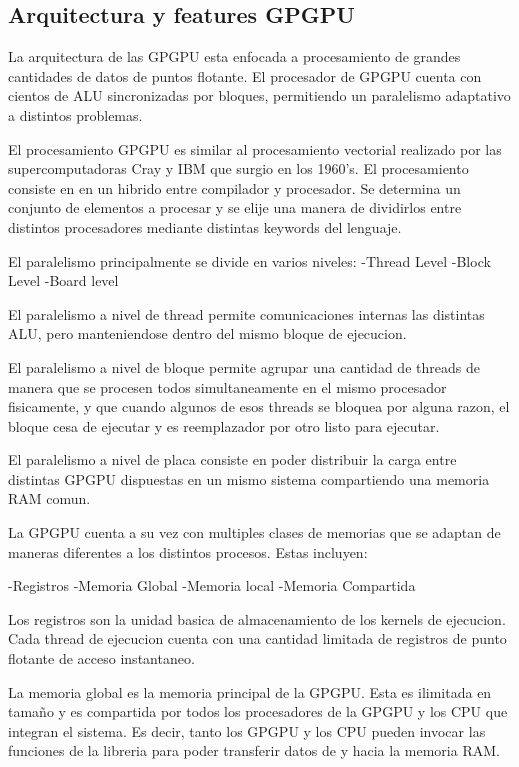 \subsection{Arquitectura y features GPGPU}


La arquitectura de las GPGPU esta enfocada a procesamiento de grandes cantidades de datos
de puntos flotante. El procesador de GPGPU cuenta con cientos de ALU sincronizadas
por bloques, permitiendo un paralelismo adaptativo a distintos problemas.

El procesamiento GPGPU es similar al procesamiento vectorial 
realizado por las supercomputadoras Cray y IBM que surgio en los 1960's.
El procesamiento consiste en en un hibrido entre compilador y procesador. Se determina
un conjunto de elementos a procesar y se elije una manera de dividirlos entre distintos
procesadores mediante distintas keywords del lenguaje. 

El paralelismo principalmente se divide en varios niveles:
-Thread Level
-Block Level
-Board level

El paralelismo a nivel de thread permite comunicaciones internas las distintas ALU, pero
manteniendose dentro del mismo bloque de ejecucion.

El paralelismo a nivel de bloque permite agrupar una cantidad de threads de manera
que se procesen todos simultaneamente en el mismo procesador fisicamente, y que
cuando algunos de esos threads se bloquea por alguna razon, el bloque cesa de ejecutar
y es reemplazador por otro listo para ejecutar.

El paralelismo a nivel de placa consiste en poder distribuir la carga entre distintas
GPGPU dispuestas en un mismo sistema compartiendo una memoria RAM comun. 

La GPGPU cuenta a su vez con multiples clases de memorias que se adaptan de maneras
diferentes a los distintos procesos. Estas incluyen:

-Registros
-Memoria Global
-Memoria local
-Memoria Compartida

Los registros son la unidad basica de almacenamiento de los kernels de ejecucion.
Cada thread de ejecucion cuenta con una cantidad limitada de registros de punto flotante de
acceso instantaneo. 

La memoria global es la memoria principal de la GPGPU. Esta es ilimitada en tama\~no 
y es compartida por todos los procesadores de la GPGPU y los CPU que integran el 
sistema. Es decir, tanto los GPGPU y los CPU pueden invocar las funciones de la libreria
para poder transferir datos de y hacia la memoria RAM.

